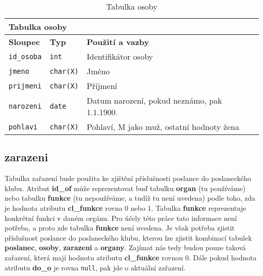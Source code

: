 \begin{center}
	\begin{longtable}{|l|l|p{9cm}|}
		\caption{Tabulka osoby
		} \label{table:osoby} \\
		
		\hline 
		
		\multicolumn{3}{|l|}{\textbf{Tabulka osoby
		}} \\
		
		\hline 
		
		\multicolumn{1}{|l|}{\textbf{Sloupec}} & \multicolumn{1}{l|}{\textbf{Typ}} & \multicolumn{1}{l|}{\textbf{Použití a vazby}} \\ 
		
		\endhead
		
		\hline 
		
		\lstinline|id_osoba| & \lstinline|int| & Identifikátor osoby \\
		
		\hline 
		
		\lstinline|jmeno| & \lstinline|char(X)| & Jméno \\
		
		\hline 
		
		\lstinline|prijmeni| & \lstinline|char(X)| & Příjmení \\
		
		\hline 
		
		\lstinline|narozeni| & \lstinline|date| & Datum narození, pokud neznámo, pak 1.1.1900. \\
		
		\hline 
		
		\lstinline|pohlavi| & \lstinline|char(X)| & Pohlaví, M jako muž, ostatní hodnoty žena \\
		
		\hline 
		
		
	\end{longtable}
\end{center}

\subsection*{zarazeni}

Tabulka zařazení bude použita ke zjištění příslušnosti poslance do poslaneckého klubu. Atribut \textbf{id\_of} může reprezentovat buď tabulku \textbf{organ} (tu používáme) nebo tabulku \textbf{funkce} (tu nepoužíváme, a tudíž tu není uvedena) podle toho, zda je hodnota atributu \textbf{cl\_funkce} rovna 0 nebo 1. Tabulka \textbf{funkce} reprezentuje konkrétní funkci v daném orgánu. Pro účely této práce tato informace není potřeba, a proto zde tabulka \textbf{funkce} není uvedena. Je však potřeba zjistit příslušnost poslance do poslaneckého klubu, kterou lze zjistit kombinací tabulek \textbf{poslanec}, \textbf{osoby}, \textbf{zarazeni} a \textbf{organy}. Zajímat nás tedy budou pouze taková zařazení, která mají hodnotu atributu \textbf{cl\_funkce} rovnou 0. Dále pokud hodnota atributu \textbf{do\_o} je rovna \lstinline|null|, pak jde o aktuální zařazení.


